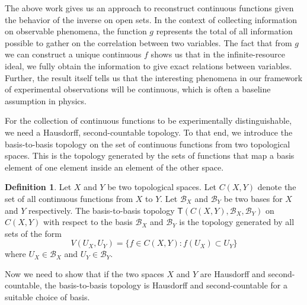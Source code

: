\documentclass[review]{elsarticle}
\theoremstyle{plain}%
\theoremstyle{definition}
\newtheorem{defn}{Definition}[section]
\theoremstyle{remark}
\begin{document}
The above work gives us an approach to reconstruct continuous functions given the behavior of the inverse on open sets. In the context of collecting information on observable phenomena, the function $g$ represents the total of all information possible to gather on the correlation between two variables. The fact that from $g$ we can construct a unique continuous $f$ shows us that in the infinite-resource ideal, we fully obtain the information to give exact relations between variables. Further, the result itself tells us that the interesting phenomena in our framework of experimental observations will be continuous, which is often a baseline assumption in physics. 


For the collection of continuous functions to be experimentally distinguishable, we need a Hausdorff, second-countable topology. To that end, we introduce the basis-to-basis topology on the set of continuous functions from two topological spaces. This is the topology generated by the sets of functions that map a basis element of one element inside an element of the other space. 

\begin{defn} Let $X$ and $Y$ be two topological spaces. Let $C(X,Y)$ denote the set of all continuous functions from $X$ to $Y$. Let $\mathcal{B}_X$ and $\mathcal{B}_Y$ be two bases for $X$ and $Y$ respectively. The basis-to-basis topology $\mathsf{T}(C(X,Y), \mathcal{B}_X, \mathcal{B}_Y)$ on $C(X,Y)$ with respect to the basis $\mathcal{B}_X$ and $\mathcal{B}_Y$ is the topology generated by all sets of the form 
	$$
	V(U_X, U_Y) = \{f\in C(X,Y) : f(U_X)\subset U_Y\}
	$$
where $U_X \in \mathcal{B}_X$ and $U_Y \in \mathcal{B}_Y$.
\end{defn}

Now we need to show that if the two spaces $X$ and $Y$ are Hausdorff and second-countable, the basis-to-basis topology is Hausdorff and second-countable for a suitable choice of basis.
\end{document}
